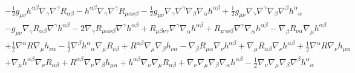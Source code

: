 \documentclass[10pt,letterpaper]{article}
\numberwithin{equation}{section}
\begin{document}
\begin{align}
& -  \tfrac{1}{2} g_{\mu \nu} h^{\alpha \beta} \nabla_{\gamma}\nabla^{\gamma}R_{\alpha \beta} -  h^{\alpha \beta} \nabla_{\gamma}\nabla^{\gamma}R_{\mu \alpha \nu \beta} -  \tfrac{1}{2} g_{\mu \nu} \nabla_{\gamma}\nabla^{\gamma}\nabla_{\beta}\nabla_{\alpha}h^{\alpha \beta} + \tfrac{1}{2} g_{\mu \nu} \nabla_{\gamma}\nabla^{\gamma}\nabla_{\beta}\nabla^{\beta}h^{\alpha}{}_{\alpha}\nonumber \\
& -  g_{\mu \nu} \nabla_{\gamma}R_{\alpha \beta} \nabla^{\gamma}h^{\alpha \beta} - 2 \nabla_{\gamma}R_{\mu \alpha \nu \beta} \nabla^{\gamma}h^{\alpha \beta} + R_{\mu \beta \nu \gamma} \nabla^{\gamma}\nabla_{\alpha}h^{\alpha \beta} + R_{\mu \gamma \nu \beta} \nabla^{\gamma}\nabla_{\alpha}h^{\alpha \beta} -  \nabla_{\beta}R_{\nu \alpha} \nabla_{\mu}h^{\alpha \beta}\nonumber \\
& + \tfrac{1}{2} \nabla^{\alpha}R \nabla_{\mu}h_{\nu \alpha} -  \tfrac{1}{2} \nabla^{\beta}h^{\alpha}{}_{\alpha} \nabla_{\mu}R_{\nu \beta} + R^{\alpha \beta} \nabla_{\mu}\nabla_{\beta}h_{\nu \alpha} -  \nabla_{\beta}R_{\mu \alpha} \nabla_{\nu}h^{\alpha \beta} + \nabla_{\mu}R_{\alpha \beta} \nabla_{\nu}h^{\alpha \beta} + \tfrac{1}{2} \nabla^{\alpha}R \nabla_{\nu}h_{\mu \alpha} \nonumber \\
&+ \nabla_{\mu}h^{\alpha \beta} \nabla_{\nu}R_{\alpha \beta}+ R^{\alpha \beta} \nabla_{\nu}\nabla_{\beta}h_{\mu \alpha} + h^{\alpha \beta} \nabla_{\nu}\nabla_{\mu}R_{\alpha \beta} + \nabla_{\nu}\nabla_{\mu}\nabla_{\beta}\nabla_{\alpha}h^{\alpha \beta} -  \tfrac{1}{2} \nabla_{\nu}\nabla_{\mu}\nabla_{\beta}\nabla^{\beta}h^{\alpha}{}_{\alpha} \nonumber
\end{align}
\end{document}

